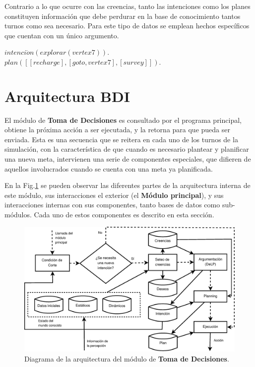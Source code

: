 \documentclass[oneside]{book}
\theoremstyle{definition}
\newcommand{\lit}[1]{\mbox{$ #1$}}
\begin{document}
Contrario a lo que ocurre con las creencias, tanto las intenciones como los planes 
constituyen información que debe perdurar en la base de conocimiento tantos turnos 
como sea necesario. Para este tipo de datos se emplean hechos específicos que cuentan 
con un único argumento.

\vspace*{1em}
\noindent\lit{intenci\acute{o}n(explorar(vertex7)).}\\
\lit{plan([[recharge], [goto, vertex7], [survey]]).}

\section{Arquitectura BDI} %

\label{sec:arquitecturaBDI}

El módulo de \textbf{Toma de Decisiones} es consultado por el programa 
principal, obtiene la próxima acción a ser ejecutada, y la retorna para que 
pueda ser enviada. Esta es una secuencia que se reitera en cada uno de los 
turnos de la simulación, con la característica de que cuando es necesario 
plantear y planificar una nueva meta, intervienen una serie de componentes 
especiales, que difieren de aquellos involucrados cuando se cuenta con una 
meta ya planificada. 

En la Fig.\ref{fig:agentProlog} se pueden observar las diferentes partes de la
arquitectura interna de este módulo, sus interacciones el exterior (el 
\textbf{Módulo principal}), y sus interacciones internas con sus componentes,
tanto bases de datos como sub-módulos. Cada uno de estos componentes es 
descrito en esta sección.

\begin{figure}
 \includegraphics[width=\textwidth]{agent_prolog.eps}
 \caption{Diagrama de la arquitectura del módulo de \textbf{Toma de Decisiones}.}
 \label{fig:agentProlog}
\end{figure}
\end{document}
